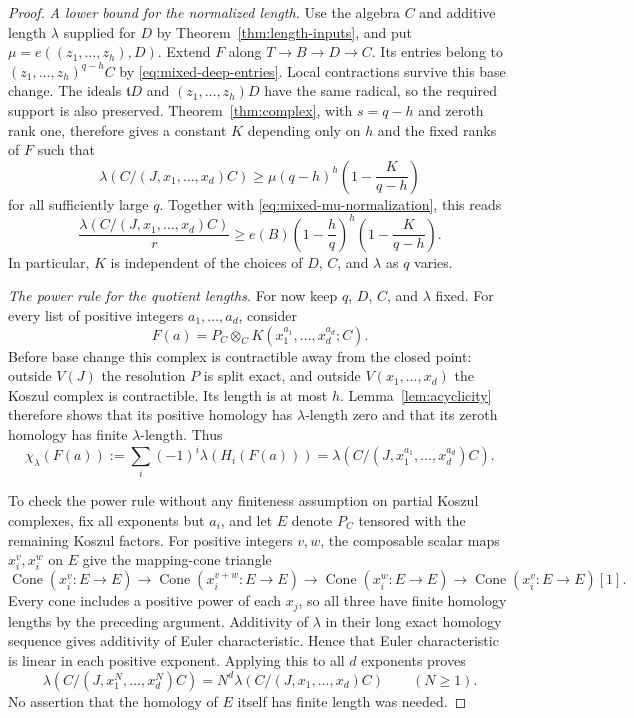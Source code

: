 \begin{proof}
\medskip
\noindent\emph{A lower bound for the normalized length.}
Use the algebra $C$ and additive length $\lambda$ supplied for $D$
by Theorem~\ref{thm:length-inputs}, and put
$\mu=e((z_1,\ldots,z_h),D)$.  Extend $F$ along
$T\longrightarrow B\longrightarrow D\longrightarrow C$.
Its entries belong to $(z_1,\ldots,z_h)^{q-h}C$ by
\eqref{eq:mixed-deep-entries}.  Local contractions survive this
base change.  The ideals $\mathfrak tD$ and $(z_1,\ldots,z_h)D$
have the same radical, so the required support is also preserved.
Theorem~\ref{thm:complex}, with $s=q-h$ and zeroth rank one,
therefore gives a constant $K$ depending only on $h$ and the fixed
ranks of $F$ such that
\[
 \lambda(C/(J,x_1,\ldots,x_d)C)
 \geq \mu(q-h)^h\left(1-\frac{K}{q-h}\right)
\]
for all sufficiently large $q$.  Together with
\eqref{eq:mixed-mu-normalization}, this reads
\begin{equation}\label{eq:mixed-lower-bound}
 \frac{\lambda(C/(J,x_1,\ldots,x_d)C)}{r}
 \geq e(B)\left(1-\frac hq\right)^h
                  \left(1-\frac{K}{q-h}\right).
\end{equation}
In particular, $K$ is independent of the choices of $D$, $C$, and
$\lambda$ as $q$ varies.

\medskip
\noindent\emph{The power rule for the quotient lengths.}
For now keep $q$, $D$, $C$, and $\lambda$ fixed.  For every list of
positive integers $a_1,\ldots,a_d$, consider
\[
 F(a)=P_C\otimes_C K(x_1^{a_1},\ldots,x_d^{a_d};C).
\]
Before base change this complex is contractible away from the
closed point: outside $V(J)$ the resolution $P$ is split exact,
and outside $V(x_1,\ldots,x_d)$ the Koszul complex is contractible.
Its length is at most $h$.  Lemma~\ref{lem:acyclicity} therefore
shows that its positive homology has $\lambda$-length zero and
that its zeroth homology has finite $\lambda$-length.  Thus
\[
 \chi_\lambda(F(a))
 :=\sum_i(-1)^i\lambda(H_i(F(a)))
 =\lambda(C/(J,x_1^{a_1},\ldots,x_d^{a_d})C).
\]

To check the power rule without any finiteness assumption on
partial Koszul complexes, fix all exponents but $a_i$, and let
$E$ denote $P_C$ tensored with the remaining Koszul factors.
For positive integers $v,w$, the composable scalar maps
$x_i^v,x_i^w$ on $E$ give the mapping-cone triangle
\[
 \operatorname{Cone}(x_i^v:E\to E)
 \longrightarrow\operatorname{Cone}(x_i^{v+w}:E\to E)
 \longrightarrow\operatorname{Cone}(x_i^w:E\to E)
 \longrightarrow\operatorname{Cone}(x_i^v:E\to E)[1].
\]
Every cone includes a positive power of each $x_j$, so all three
have finite homology lengths by the preceding argument.  Additivity
of $\lambda$ in their long exact homology sequence gives additivity
of Euler characteristic.  Hence that Euler characteristic is
linear in each positive exponent.  Applying this to all $d$
exponents proves
\begin{equation}\label{eq:mixed-length-power-rule}
 \lambda(C/(J,x_1^N,\ldots,x_d^N)C)
   =N^d\lambda(C/(J,x_1,\ldots,x_d)C)
 \qquad(N\geq1).
\end{equation}
No assertion that the homology of $E$ itself has finite length was
needed.


\end{proof}
